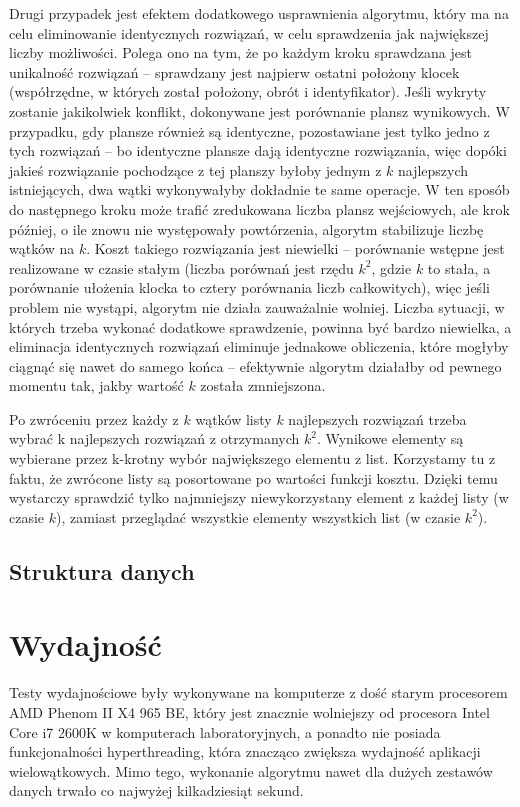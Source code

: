 \documentclass{article}
\begin{document}
Drugi przypadek jest efektem dodatkowego usprawnienia algorytmu, który ma na celu eliminowanie identycznych rozwiązań, w celu sprawdzenia jak największej liczby możliwości. Polega ono na tym, że po każdym kroku sprawdzana jest unikalność rozwiązań -- sprawdzany jest najpierw ostatni położony klocek (współrzędne, w których został położony, obrót i identyfikator). Jeśli wykryty zostanie jakikolwiek konflikt, dokonywane jest porównanie plansz wynikowych. W przypadku, gdy plansze również są identyczne, pozostawiane jest tylko jedno z tych rozwiązań -- bo identyczne plansze dają identyczne rozwiązania, więc dopóki jakieś rozwiązanie pochodzące z tej planszy byłoby jednym z $k$ najlepszych istniejących, dwa wątki wykonywałyby dokładnie te same operacje. W ten sposób do następnego kroku może trafić zredukowana liczba plansz wejściowych, ale krok później, o ile znowu nie występowały powtórzenia, algorytm stabilizuje liczbę wątków na $k$. Koszt takiego rozwiązania jest niewielki -- porównanie wstępne jest realizowane w czasie stałym (liczba porównań jest rzędu $k^2$, gdzie $k$ to stała, a porównanie ułożenia klocka to cztery porównania liczb całkowitych), więc jeśli problem nie wystąpi, algorytm nie działa zauważalnie wolniej. Liczba sytuacji, w których trzeba wykonać dodatkowe sprawdzenie, powinna być bardzo niewielka, a eliminacja identycznych rozwiązań eliminuje jednakowe obliczenia, które mogłyby ciągnąć się nawet do samego końca -- efektywnie algorytm działałby od pewnego momentu tak, jakby wartość $k$ została zmniejszona.

Po zwróceniu przez każdy z $k$ wątków listy $k$ najlepszych rozwiązań trzeba wybrać k najlepszych rozwiązań z otrzymanych $k^2$.  
Wynikowe elementy są wybierane przez k-krotny wybór największego elementu z list.
Korzystamy tu z faktu, że zwrócone listy są posortowane po wartości funkcji kosztu.
Dzięki temu wystarczy sprawdzić tylko najmniejszy niewykorzystany element z każdej listy (w czasie $k$), zamiast przeglądać wszystkie elementy wszystkich list (w czasie $k^2$).
\subsection{Struktura danych}

\clearpage
\section{Wydajność}
Testy wydajnościowe były wykonywane na komputerze z dość starym procesorem AMD Phenom II X4 965 BE, który jest znacznie wolniejszy od procesora Intel Core i7 2600K w komputerach laboratoryjnych, a ponadto nie posiada funkcjonalności hyperthreading, która znacząco zwiększa wydajność aplikacji wielowątkowych. Mimo tego, wykonanie algorytmu nawet dla dużych zestawów danych trwało co najwyżej kilkadziesiąt sekund.
\end{document}
